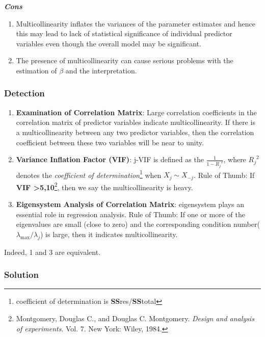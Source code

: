 \emph{\textbf{\emph{Cons}}}

\begin{enumerate}
	\def\labelenumi{\arabic{enumi}.}
	\item
	Multicollinearity inflates the variances of the parameter estimates
	and hence this may lead to lack of statistical significance of
	individual predictor variables even though the overall model may be
	significant.
	\item
	The presence of multicollinearity can cause serious problems with the
	estimation of \(\beta\) and the interpretation.
\end{enumerate}

\subsubsection{Detection}\label{detection}

\begin{enumerate}
	\def\labelenumi{\arabic{enumi}.}
	\item
	\textbf{Examination of Correlation Matrix}: Large correlation
	coefficients in the correlation matrix of predictor variables indicate
	multicollinearity. If there is a multicollinearity between any two
	predictor variables, then the correlation coefficient between these
	two variables will be near to unity.
	\item
	\textbf{Variance Inflation Factor (VIF)}: j-VIF is defined as the
	\(\frac{1}{1 - {R_{j}}^{2}}\), where \({R_{j}}^{2}\)denotes the
	\emph{coefficient of determination}\footnote{coefficient of
		determination is \textbf{SS}res/\textbf{SS}total} when
	\(X_{j} \sim X_{- j}\). Rule of Thumb: If \textbf{VIF
		\textgreater{}5,10}\footnote{Montgomery, Douglas C., and Douglas C.
		Montgomery. \emph{Design and analysis of experiments}. Vol. 7. New
		York: Wiley, 1984.}, then we say the multicollinearity is heavy.
	\item
	\textbf{Eigensystem Analysis of Correlation Matrix}: eigensystem plays
	an essential role in regression analysis. Rule of Thumb: If one or
	more of the eigenvalues are small (close to zero) and the
	corresponding condition number(\(\lambda_{\max}/\lambda_{j}\)) is
	large, then it indicates multicollinearity.
\end{enumerate}

Indeed, 1 and 3 are equivalent.

\subsubsection{Solution}\label{solution}

